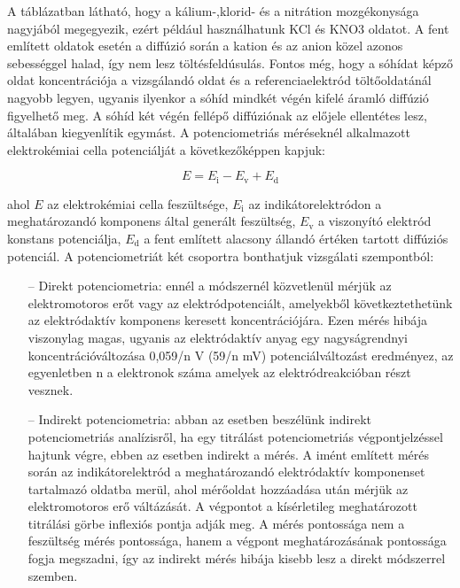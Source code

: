 A táblázatban látható, hogy a kálium-,klorid- és a nitrátion mozgékonysága nagyjából megegyezik, ezért például használhatunk KCl és KNO3 oldatot.
A fent említett oldatok esetén a diffúzió során a kation és az anion közel azonos sebességgel halad, így nem lesz töltésfeldúsulás. Fontos még, hogy a sóhídat képző oldat koncentrációja a vizsgálandó oldat és a referenciaelektród töltőoldatánál nagyobb legyen, ugyanis ilyenkor a sóhíd mindkét végén kifelé áramló diffúzió figyelhető meg. A sóhíd két végén fellépő diffúziónak az előjele ellentétes lesz, általában kiegyenlítik egymást. A potenciometriás méréseknél alkalmazott elektrokémiai cella potenciálját a következőképpen kapjuk:

\begin{equation}
E= E_\text{i} - E_\text{v} + E_\text{d}
\end{equation}

ahol $E$ az elektrokémiai cella feszültsége, $E_\text{i}$ az indikátorelektródon a meghatározandó komponens által generált feszültség, $E_\text{v}$ a viszonyító elektród konstans potenciálja, $E_\text{d}$ a fent említett alacsony állandó értéken tartott diffúziós potenciál.
A potenciometriát két csoportra bonthatjuk vizsgálati szempontból: 

\begin{itemize}
\item[--]Direkt potenciometria: ennél a módszernél közvetlenül mérjük az elektromotoros erőt vagy az elektródpotenciált, amelyekből következtethetünk az elektródaktív komponens keresett koncentrációjára. Ezen mérés hibája viszonylag magas, ugyanis az elektródaktív anyag egy nagyságrendnyi koncentrációváltozása 0,059/n V (59/n mV) potenciálváltozást eredményez, az egyenletben n a elektronok száma amelyek az elektródreakcióban részt vesznek.
\item[--]Indirekt potenciometria: abban az esetben beszélünk indirekt potenciometriás analízisről, ha egy titrálást potenciometriás végpontjelzéssel hajtunk végre, ebben az esetben indirekt a mérés. A imént említett mérés során az indikátorelektród a meghatározandó elektródaktív komponenset tartalmazó oldatba merül, ahol mérőoldat hozzáadása után mérjük az elektromotoros erő váltázását. A végpontot a kísérletileg meghatározott titrálási görbe inflexiós pontja adják meg. A mérés pontossága nem a feszültség mérés  pontossága, hanem a végpont meghatározásának pontossága fogja megszadni, így az indirekt mérés hibája kisebb lesz a direkt módszerrel szemben.
\end{itemize}

